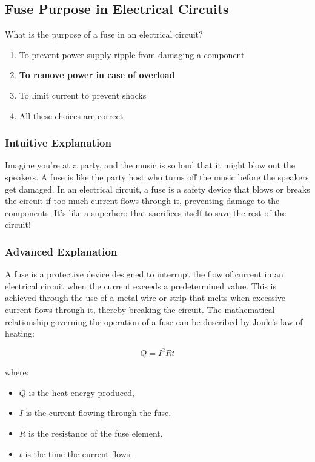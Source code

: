 \subsection{Fuse Purpose in Electrical Circuits}
\label{T0A04}

\begin{tcolorbox}[colback=gray!10!white,colframe=black!75!black,title=T0A04]
What is the purpose of a fuse in an electrical circuit?
\begin{enumerate}[label=\Alph*)]
    \item To prevent power supply ripple from damaging a component
    \item \textbf{To remove power in case of overload}
    \item To limit current to prevent shocks
    \item All these choices are correct
\end{enumerate}
\end{tcolorbox}

\subsubsection{Intuitive Explanation}
Imagine you're at a party, and the music is so loud that it might blow out the speakers. A fuse is like the party host who turns off the music before the speakers get damaged. In an electrical circuit, a fuse is a safety device that blows or breaks the circuit if too much current flows through it, preventing damage to the components. It’s like a superhero that sacrifices itself to save the rest of the circuit!

\subsubsection{Advanced Explanation}
A fuse is a protective device designed to interrupt the flow of current in an electrical circuit when the current exceeds a predetermined value. This is achieved through the use of a metal wire or strip that melts when excessive current flows through it, thereby breaking the circuit. The mathematical relationship governing the operation of a fuse can be described by Joule's law of heating:

\[
Q = I^2 R t
\]

where:
\begin{itemize}
    \item \( Q \) is the heat energy produced,
    \item \( I \) is the current flowing through the fuse,
    \item \( R \) is the resistance of the fuse element,
    \item \( t \) is the time the current flows.
\end{itemize}

